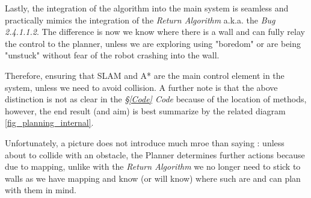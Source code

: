 \documentclass[11pt, a4paper]{article}
\begin{document}
Lastly, the integration of the algorithm into the main system is seamless and practically mimics the integration of the \textit{Return Algorithm}\cite{task2_report} a.k.a. the \textit{Bug 2.4.1.1.2}. The difference is now we know where there is a wall and can fully relay the control to the planner, unless we are exploring using "boredom"\cite{task2_report} or are being "unstuck"\cite{task2_report} without fear of the robot crashing into the wall. 

Therefore, ensuring that SLAM and A* are the main control element in the system, unless we need to avoid collision. A further note is that the above distinction is not as clear in the \textit{\S\ref{Code} Code} because of the location of methods, however, the end result (and aim) is best summarize by the related diagram \ref{fig_planning_internal}.

Unfortunately, a picture does not introduce much mroe than saying : unless about to collide with an obstacle, the Planner determines further actions because due to mapping, unlike with the \textit{Return Algorithm}\cite{task2_report} we no longer need to stick to walls as we have mapping and know (or will know) where such are and can plan with them in mind.

\end{document}
